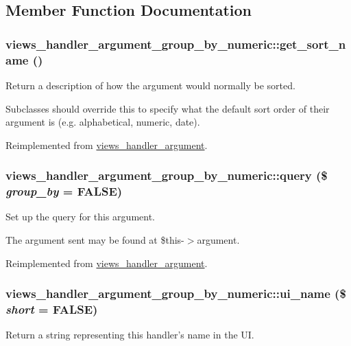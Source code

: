 \subsection{Member Function Documentation}
\hypertarget{classviews__handler__argument__group__by__numeric_aa0d331fb229f454fcc8e55d63b6a61fc}{
\subsubsection[{get\_\-sort\_\-name}]{\setlength{\rightskip}{0pt plus 5cm}views\_\-handler\_\-argument\_\-group\_\-by\_\-numeric::get\_\-sort\_\-name ()}}
\label{classviews__handler__argument__group__by__numeric_aa0d331fb229f454fcc8e55d63b6a61fc}
Return a description of how the argument would normally be sorted.

Subclasses should override this to specify what the default sort order of their argument is (e.g. alphabetical, numeric, date). 

Reimplemented from \hyperlink{classviews__handler__argument_a9fad9ab1a7aaa5915baf13a2872faa70}{views\_\-handler\_\-argument}.\hypertarget{classviews__handler__argument__group__by__numeric_ae17513cfe9036aba188964ef9982852b}{
\subsubsection[{query}]{\setlength{\rightskip}{0pt plus 5cm}views\_\-handler\_\-argument\_\-group\_\-by\_\-numeric::query (\$ {\em group\_\-by} = {\ttfamily FALSE})}}
\label{classviews__handler__argument__group__by__numeric_ae17513cfe9036aba188964ef9982852b}
Set up the query for this argument.

The argument sent may be found at \$this-\/$>$argument. 

Reimplemented from \hyperlink{classviews__handler__argument_af9ddabf5d386782c8ffc5785b7ae4263}{views\_\-handler\_\-argument}.\hypertarget{classviews__handler__argument__group__by__numeric_aad9d8a9bd1b787224b8f811997c9d8eb}{
\subsubsection[{ui\_\-name}]{\setlength{\rightskip}{0pt plus 5cm}views\_\-handler\_\-argument\_\-group\_\-by\_\-numeric::ui\_\-name (\$ {\em short} = {\ttfamily FALSE})}}
\label{classviews__handler__argument__group__by__numeric_aad9d8a9bd1b787224b8f811997c9d8eb}
Return a string representing this handler's name in the UI. 

